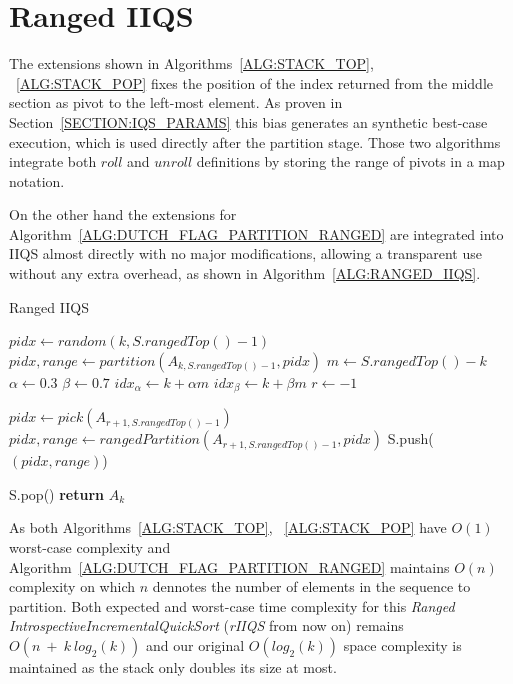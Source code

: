 \section{Ranged IIQS}
The extensions shown in Algorithms~\ref{ALG:STACK_TOP}, ~\ref{ALG:STACK_POP} fixes the position of the index returned from the middle section as pivot to the left-most element. As proven in Section~\ref{SECTION:IQS_PARAMS} this bias generates an synthetic best-case execution, which is used directly after the partition stage. Those two algorithms integrate both $roll$ and $unroll$ definitions by storing the range of pivots in a map notation.


On the other hand the extensions for Algorithm~\ref{ALG:DUTCH_FLAG_PARTITION_RANGED} are integrated into IIQS almost directly with no major modifications, allowing a transparent use without any extra overhead, as shown in Algorithm~\ref{ALG:RANGED_IIQS}.

\begin{algorithm}
  \begin{algorithmic}[1]
    \caption{Ranged IIQS} \label{ALG:RANGED_IIQS}
        \State $pidx \gets random(k,S.rangedTop()-1)$
        \State $pidx, range \gets partition(A_{k,S.rangedTop()-1}, pidx)$
        \State $m \gets S.rangedTop() - k$
        \State $\alpha \gets 0.3$
        \State $\beta \gets 0.7$
        \State $idx_\alpha \gets k + \alpha m$
        \State $idx_\beta \gets k + \beta m$
        \State $r \gets -1$

            \State $pidx \gets pick(A_{r+1,S.rangedTop()-1})$
            \State $pidx, range \gets rangedPartition(A_{r+1,S.rangedTop()-1},pidx)$
        \EndIf
        \State S.push($(pidx, range)$)

    \EndWhile
    \State S.pop()
    \State \textbf{return} $A_{k}$\label{IIQS_main_cycle}
    \EndProcedure
  \end{algorithmic}
\end{algorithm}

As both Algorithms~\ref{ALG:STACK_TOP}, ~\ref{ALG:STACK_POP} have $O(1)$ worst-case complexity and Algorithm~\ref{ALG:DUTCH_FLAG_PARTITION_RANGED} maintains $O(n)$ complexity on which $n$ dennotes the number of elements in the sequence to partition. Both expected and worst-case time complexity for this \emph{Ranged IntrospectiveIncrementalQuickSort} (\emph{rIIQS} from now on) remains $O(n~+~k~log_2(k))$ and our original $O(log_2(k))$ space complexity is maintained as the stack only doubles its size at most.

